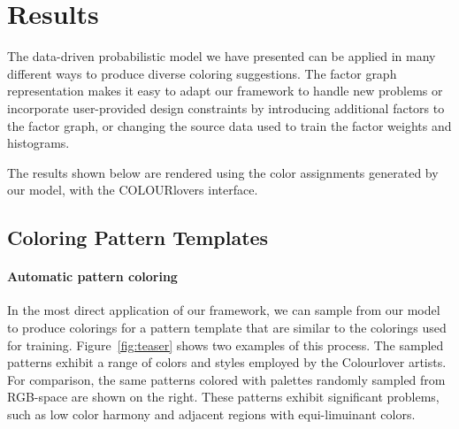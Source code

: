 \section{Results}
\label{sec:results}

The data-driven probabilistic model we have presented can be applied in many different ways to produce diverse coloring suggestions. The factor graph representation makes it easy to adapt our framework to handle new problems or incorporate user-provided design constraints by introducing additional factors to the factor graph, or changing the source data used to train the factor weights and histograms.


The results shown below are rendered using the color assignments generated by our model, with the COLOURlovers interface. 

\subsection{Coloring Pattern Templates}

\paragraph{Automatic pattern coloring} In the most direct application of our framework, we can sample from our model to produce colorings for a pattern template that are similar to the colorings used for training. Figure~\ref{fig:teaser} shows two examples of this process. The sampled patterns exhibit a range of colors and styles employed by the Colourlover artists. For comparison, the same patterns colored with palettes randomly sampled from RGB-space are shown on the right. These patterns exhibit significant problems, such as low color harmony and adjacent regions with equi-limuinant colors.

